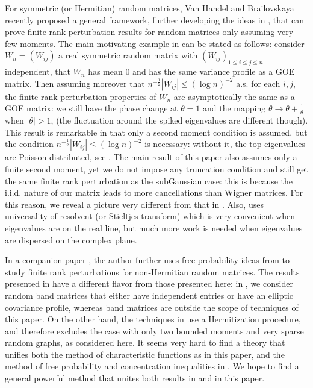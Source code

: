 \documentclass[12pt, reqno]{amsart}
\theoremstyle{definition}
\theoremstyle{remark}
\numberwithin{equation}{section}
\begin{document}
For symmetric (or Hermitian) random matrices, Van Handel and Brailovskaya \cite{brailovskaya2022universality} recently proposed a general framework, further developing the ideas in \cite{bandeira2023matrix}, that can prove finite rank perturbation results for random matrices only assuming very few moments. The main motivating example in \cite{brailovskaya2022universality} can be stated as follows: consider $W_n=(W_{ij})$ a real symmetric random matrix with $(W_{ij})_{1\leq i\leq j\leq n}$ independent, that $W_n$ has mean $0$ and has the same variance profile as a GOE matrix. Then assuming moreover that $n^{-\frac{1}{2}}|W_{ij}|\leq (\log n)^{-2}$ a.s. for each $i,j$, the finite rank perturbation properties of $W_n$ are asymptotically the same as a GOE matrix: we still have the phase change at $\theta=1$ and the mapping $\theta\to\theta+\frac{1}{\theta}$ when $|\theta|>1$, (the fluctuation around the spiked eigenvalues are different though). This result is remarkable in that only a second moment condition is assumed, but the condition $n^{-\frac{1}{2}}|W_{ij}|\leq (\log n)^{-2}$ is necessary: without it, the top eigenvalues are Poisson distributed, see \cite{diaconu2022finite}. The main result of this paper also assumes only a finite second moment, yet we do not impose any truncation condition and still get the same finite rank perturbation as the subGaussian case: this is because the i.i.d. nature of our matrix leads to more cancellations than Wigner matrices. For this reason, we reveal a picture very different from that in \cite{brailovskaya2022universality}. Also, \cite{brailovskaya2022universality} uses universality of resolvent (or Stieltjes transform) which is very convenient when eigenvalues are on the real line, but much more work is needed when eigenvalues are dispersed on the complex plane. 

In a companion paper \cite{han2024outliers}, the author further uses free probability ideas from \cite{bandeira2023matrix} to study finite rank perturbations for non-Hermitian random matrices. The results presented in \cite{han2024outliers} have a different flavor from those presented here: in \cite{han2024outliers}, we consider random band matrices that either have independent entries or have an elliptic covariance profile, whereas band matrices are outside the scope of techniques of this paper. On the other hand, the techniques in \cite{han2024outliers} use a Hermitization procedure, and therefore excludes the case with only two bounded moments and very sparse random graphs, as considered here. It seems very hard to find a theory that unifies both the method of characteristic functions as in this paper, and the method of free probability and concentration inequalities in \cite{han2024outliers}. We hope to find a general powerful method that unites both results in \cite{han2024outliers} and in this paper.
\end{document}

